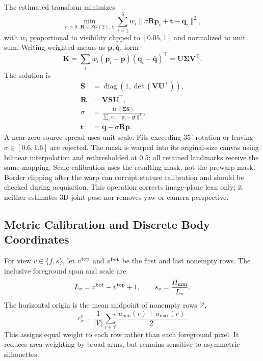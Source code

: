 \documentclass[journal]{IEEEtran}
\begin{document}
The estimated transform minimizes
\begin{equation}
\min_{\sigma>0,\,\mathbf R\in SO(2),\,\mathbf t}
\sum_{i=1}^{6}w_i\|\sigma\mathbf R\mathbf p_i+\mathbf t-\mathbf q_i\|^2,
\label{eq:procrustes_objective}
\end{equation}
with $w_i$ proportional to visibility clipped to $[0.05,1]$ and normalized to unit sum. Writing weighted means as $\bar{\mathbf p},\bar{\mathbf q}$, form
\begin{equation}
\mathbf K=\sum_iw_i(\mathbf p_i-\bar{\mathbf p})(\mathbf q_i-\bar{\mathbf q})^\top
=\mathbf U\mathbf\Sigma\mathbf V^\top.
\label{eq:svd_cov}
\end{equation}
The solution is
\begin{align}
\mathbf S&=\operatorname{diag}(1,\det(\mathbf V\mathbf U^\top)),\nonumber\\
\mathbf R&=\mathbf V\mathbf S\mathbf U^\top,\label{eq:rotation}\\
\sigma&=\frac{\operatorname{tr}(\mathbf\Sigma\mathbf S)}{\sum_iw_i\|\mathbf p_i-\bar{\mathbf p}\|^2},\label{eq:procrustes_scale_trans}\\
\mathbf t&=\bar{\mathbf q}-\sigma\mathbf R\bar{\mathbf p}.\nonumber
\end{align}
A near-zero source spread uses unit scale. Fits exceeding $35^\circ$ rotation or leaving $\sigma\in[0.6,1.6]$ are rejected. The mask is warped into its original-size canvas using bilinear interpolation and rethresholded at $0.5$; all retained landmarks receive the same mapping. Scale calibration uses the resulting mask, not the prewarp mask. Border clipping after the warp can corrupt stature calibration and should be checked during acquisition. This operation corrects image-plane lean only; it neither estimates 3D joint pose nor removes yaw or camera perspective.

\subsection{Metric Calibration and Discrete Body Coordinates}
\label{subsec:calibration}
For view $v\in\{f,s\}$, let $v^{\rm top}$ and $v^{\rm bot}$ be the first and last nonempty rows. The inclusive foreground span and scale are
\begin{equation}
L_v=v^{\rm bot}-v^{\rm top}+1,\qquad s_v=\frac{H_{\rm mm}}{L_v}.
\label{eq:scale_front}
\end{equation}
The horizontal origin is the mean midpoint of nonempty rows $\mathcal V$,
\begin{equation}
c_x^v=\frac{1}{|\mathcal V|}\sum_{r\in\mathcal V}\frac{u_{\min}(r)+u_{\max}(r)}{2}.
\label{eq:centerline}
\end{equation}
This assigns equal weight to each row rather than each foreground pixel. It reduces area weighting by broad arms, but remains sensitive to asymmetric silhouettes.
\end{document}
